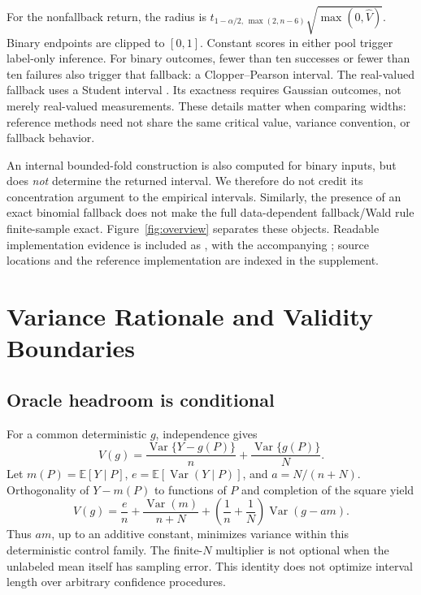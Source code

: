 \documentclass{article}
\newcommand{\E}{\mathbb E}
\newcommand{\Var}{\operatorname{Var}}
\begin{document}
For the nonfallback return, the radius is $t_{1-\alpha/2,\,\max(2,n-6)}\sqrt{\max(0,\widehat V)}$. Binary endpoints are clipped to $[0,1]$. Constant scores in either pool trigger label-only inference. For binary outcomes, fewer than ten successes or fewer than ten failures also trigger that fallback: a Clopper--Pearson interval. The real-valued fallback uses a Student interval \citep{Student}. Its exactness requires Gaussian outcomes, not merely real-valued measurements. These details matter when comparing widths: reference methods need not share the same critical value, variance convention, or fallback behavior.

An internal bounded-fold construction is also computed for binary inputs, but does \emph{not} determine the returned interval. We therefore do not credit its concentration argument to the empirical intervals. Similarly, the presence of an exact binomial fallback does not make the full data-dependent fallback/Wald rule finite-sample exact. Figure~\ref{fig:overview} separates these objects. Readable implementation evidence is included as , with the accompanying ; source locations and the reference implementation are indexed in the supplement.

\section{Variance Rationale and Validity Boundaries}
\subsection{Oracle headroom is conditional}
For a common deterministic $g$, independence gives
\begin{equation}
 V(g)=\frac{\Var\{Y-g(P)\}}{n}+\frac{\Var\{g(P)\}}{N}.
\end{equation}
Let $m(P)=\E[Y\mid P]$, $e=\E[\Var(Y\mid P)]$, and $a=N/(n+N)$. Orthogonality of $Y-m(P)$ to functions of $P$ and completion of the square yield
\begin{equation}
 V(g)=\frac{e}{n}+\frac{\Var(m)}{n+N}
       +\left(\frac1n+\frac1N\right)\Var(g-am).
 \label{eq:oracle}
\end{equation}
Thus $am$, up to an additive constant, minimizes variance within this deterministic control family. The finite-$N$ multiplier is not optional when the unlabeled mean itself has sampling error. This identity does not optimize interval length over arbitrary confidence procedures.
\end{document}
